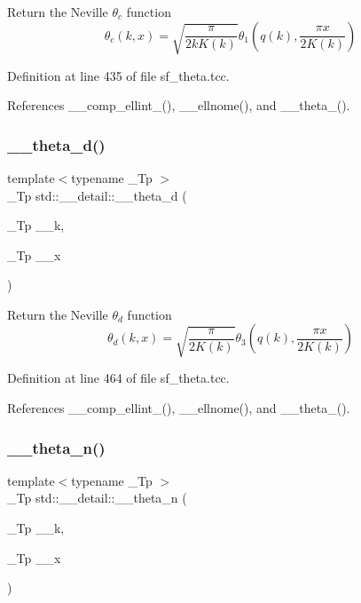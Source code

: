 Return the Neville $ \theta_c $ function \[ \theta_c(k,x) = \sqrt{\frac{\pi}{2 k K(k)}} \theta_1\left(q(k),\frac{\pi x}{2K(k)}\right) \] 

Definition at line 435 of file sf\+\_\+theta.\+tcc.



References \+\_\+\+\_\+comp\+\_\+ellint\+\_(), \+\_\+\+\_\+ellnome(), and \+\_\+\+\_\+theta\+\_().

\mbox{\label{namespacestd_1_1____detail_ad4ca29063a2f624e185592497d37a670}} 
\subsubsection{\texorpdfstring{\+\_\+\+\_\+theta\+\_\+d()}{\_\_theta\_d()}}
{\footnotesize\ttfamily template$<$typename \+\_\+\+Tp $>$ \\
\+\_\+\+Tp std\+::\+\_\+\+\_\+detail\+::\+\_\+\+\_\+theta\+\_\+d (\begin{DoxyParamCaption}\item[{\+\_\+\+Tp}]{\+\_\+\+\_\+k,  }\item[{\+\_\+\+Tp}]{\+\_\+\+\_\+x }\end{DoxyParamCaption})}

Return the Neville $ \theta_d $ function \[ \theta_d(k,x) = \sqrt{\frac{\pi}{2K(k)}} \theta_3\left(q(k),\frac{\pi x}{2K(k)}\right) \] 

Definition at line 464 of file sf\+\_\+theta.\+tcc.



References \+\_\+\+\_\+comp\+\_\+ellint\+\_(), \+\_\+\+\_\+ellnome(), and \+\_\+\+\_\+theta\+\_().

\mbox{\label{namespacestd_1_1____detail_aace76210c8f70761bb14ab602b88d027}} 
\subsubsection{\texorpdfstring{\+\_\+\+\_\+theta\+\_\+n()}{\_\_theta\_n()}}
{\footnotesize\ttfamily template$<$typename \+\_\+\+Tp $>$ \\
\+\_\+\+Tp std\+::\+\_\+\+\_\+detail\+::\+\_\+\+\_\+theta\+\_\+n (\begin{DoxyParamCaption}\item[{\+\_\+\+Tp}]{\+\_\+\+\_\+k,  }\item[{\+\_\+\+Tp}]{\+\_\+\+\_\+x }\end{DoxyParamCaption})}

